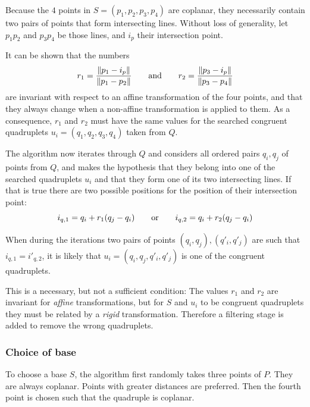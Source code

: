 Because the $4$ points in $S = (p_1, p_2, p_3, p_4)$ are coplanar, they necessarily contain two pairs of points that form intersecting lines. Without loss of generality, let $p_1 p_2$ and $p_3 p_4$ be those lines, and $i_p$ their intersection point.

It can be shown that the numbers
\begin{equation} \label{eq:4pcs_inv}
r_1 = \frac{\| p_1 - i_p \|}{\| p_1 - p_2 \|}
\hspace{7mm} \text{and} \hspace{7mm}
r_2 = \frac{\| p_3 - i_p \|}{\| p_3 - p_4 \|}
\end{equation}
are invariant with respect to an affine transformation of the four points, and that they always change when a non-affine transformation is applied to them. As a consequence, $r_1$ and $r_2$ must have the same values for the searched congruent quadruplets $u_i = (q_1, q_2, q_3, q_4)$ taken from $Q$.

The algorithm now iterates through $Q$ and considers all ordered pairs $q_i, q_j$ of points from $Q$, and makes the hypothesis that they belong into one of the searched quadruplets $u_i$ and that they form one of its two intersecting lines. If that is true there are two possible positions for the position of their intersection point:
\begin{equation}
i_{q,1} = q_i + r_1 (q_j - q_i)
\hspace{7mm} \text{or} \hspace{7mm}
i_{q,2} = q_i + r_2 (q_j - q_i)
\end{equation}

When during the iterations two pairs of points $(q_i, q_j), (q'_i, q'_j)$ are such that $i_{q,1} = i'_{q,2}$, it is likely that $u_i = (q_i, q_j, q'_i, q'_j)$ is one of the congruent quadruplets.

This is a necessary, but not a sufficient condition: The values $r_1$ and $r_2$ are invariant for \emph{affine} transformations, but for $S$ and $u_i$ to be congruent quadruplets they must be related by a \emph{rigid} transformation. Therefore a filtering stage is added to remove the wrong quadruplets. 


\subsubsection{Choice of base}
To choose a base $S$, the algorithm first randomly takes three points of $P$. They are always coplanar. Points with greater distances are preferred. Then the fourth point is chosen such that the quadruple is coplanar.
